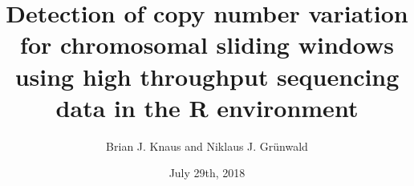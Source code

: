 \documentclass[final]{beamer} %
\title[Detecting CNV with vcfR]{Detection of copy number variation for chromosomal sliding windows using high throughput sequencing data in the R environment}
\author[Knaus \& Gr\"unwald]{Brian J. Knaus and Niklaus J. Gr\"unwald}
\institute[USDA, ARS]{USDA, ARS, Horticultural Crops Research Unit}
\date{July 29th, 2018}
\begin{document}
  \begin{frame}{}



\vspace{5mm}



\vspace{5mm}



  \end{frame}
\end{document}
